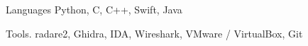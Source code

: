 
\begin{cvskills}

	\cvskill
	{Languages} %
	{Python, C, C++, Swift, Java} %

	\cvskill
	{Tools\hphantom{25}\color{white}.\hphantom{25}} %
	{radare2, Ghidra, IDA, Wireshark, VMware / VirtualBox, Git} %

\end{cvskills}
